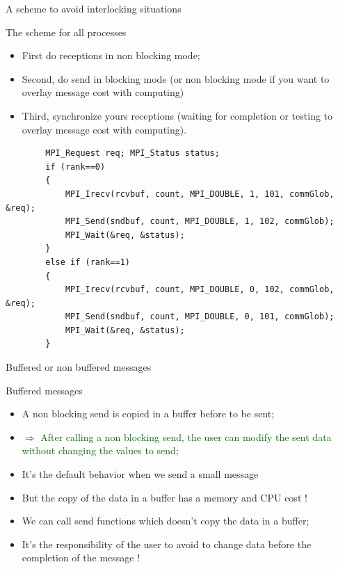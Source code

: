 \documentclass[compress,10pt,aspectratio=169]{beamer}
\begin{document}
\begin{frame}[fragile]{A scheme to avoid interlocking situations}
    \scriptsize
    \begin{block}{The scheme for all processes}
        \begin{itemize}
        \item First do receptions in non blocking mode;
        \item Second, do send in blocking mode (or non blocking mode if you want to overlay message cost with computing)
        \item Third, synchronize yours receptions (waiting for completion or testing to overlay message cost with computing).
        \end{itemize}
    \end{block}
    \begin{verbatim}
        MPI_Request req; MPI_Status status;
        if (rank==0)
        {
            MPI_Irecv(rcvbuf, count, MPI_DOUBLE, 1, 101, commGlob, &req);
            MPI_Send(sndbuf, count, MPI_DOUBLE, 1, 102, commGlob);
            MPI_Wait(&req, &status);
        }
        else if (rank==1)
        {
            MPI_Irecv(rcvbuf, count, MPI_DOUBLE, 0, 102, commGlob, &req);
            MPI_Send(sndbuf, count, MPI_DOUBLE, 0, 101, commGlob);
            MPI_Wait(&req, &status);
        }
        \end{verbatim}
\end{frame}


\begin{frame}[fragile]{Buffered or non buffered messages}

    \begin{block}{Buffered messages}
        \begin{itemize}
            \item A non blocking send is copied in a buffer before to be sent;
            \item $\Rightarrow$ \textcolor{DarkGreen}{After calling a non blocking send, the user can modify the sent data without
                  changing the values to send};
            \item It's the default behavior when we send a small message
            \item But the copy of the data in a buffer has a memory and CPU cost !
            \item We can call send functions which doesn't copy the data in a buffer;
            \item \alert{It's the responsibility of the user to avoid to change data before the completion of the message !}
        \end{itemize}
    \end{block}
\end{frame}
\end{document}
